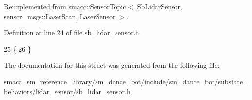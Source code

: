 Reimplemented from \hyperlink{classsmacc_1_1SensorTopic_abf9e11f5097d4581818e045738bec552}{smacc\+::\+Sensor\+Topic$<$ Sb\+Lidar\+Sensor, sensor\+\_\+msgs\+::\+Laser\+Scan, Laser\+Sensor $>$}.



Definition at line 24 of file sb\+\_\+lidar\+\_\+sensor.\+h.


\begin{DoxyCode}
25   \{
26   \}
\end{DoxyCode}


The documentation for this struct was generated from the following file\+:\begin{DoxyCompactItemize}
\item 
smacc\+\_\+sm\+\_\+reference\+\_\+library/sm\+\_\+dance\+\_\+bot/include/sm\+\_\+dance\+\_\+bot/substate\+\_\+behaviors/lidar\+\_\+sensor/\hyperlink{sb__lidar__sensor_8h}{sb\+\_\+lidar\+\_\+sensor.\+h}\end{DoxyCompactItemize}

